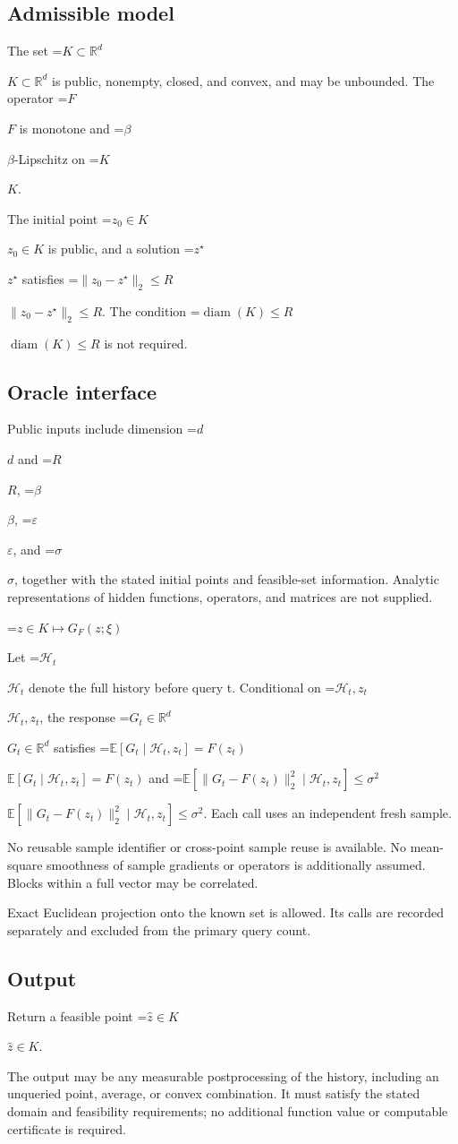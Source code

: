 \documentclass[10pt,a4paper]{article}
\newcommand{\AtlasMath}[1]{\par\begingroup\centering\setbox0=\hbox{$\displaystyle #1$}\ifdim\wd0>1.4\linewidth\typeout{ATLAS WIDE FORMULA: \the\wd0}\fi\ifdim\wd0>\linewidth\resizebox{\linewidth}{!}{\box0}\else\box0\fi\par\endgroup}
\newcommand{\AtlasInlineMath}[1]{\begingroup\setbox0=\hbox{$#1$}\ifdim\wd0>.4\linewidth\endgroup\AtlasMath{#1}\else\endgroup$#1$\fi}
\begin{document}
\subsection{Admissible model}
The set \AtlasInlineMath{K\subset\mathbb R^d} is public, nonempty, closed, and convex, and may be unbounded. The operator \AtlasInlineMath{F} is monotone and \AtlasInlineMath{\beta}-Lipschitz on \AtlasInlineMath{K}.

The initial point \AtlasInlineMath{z_0\in K} is public, and a solution \AtlasInlineMath{z^\star} satisfies \AtlasInlineMath{\|z_0-z^\star\|_2\le R}. The condition \AtlasInlineMath{\operatorname{diam}(K)\le R} is not required.

\subsection{Oracle interface}
Public inputs include dimension \AtlasInlineMath{d} and \AtlasInlineMath{R}, \AtlasInlineMath{\beta}, \AtlasInlineMath{\varepsilon}, and \AtlasInlineMath{\sigma}, together with the stated initial points and feasible-set information. Analytic representations of hidden functions, operators, and matrices are not supplied.


\AtlasMath{z\in K\longmapsto G_F(z;\xi)}


Let \AtlasInlineMath{\mathcal H_t} denote the full history before query t. Conditional on \AtlasInlineMath{\mathcal H_t,z_t}, the response \AtlasInlineMath{G_t\in\mathbb R^d} satisfies \AtlasInlineMath{\mathbb E[G_t\mid\mathcal H_t,z_t]=F(z_t)} and \AtlasInlineMath{\mathbb E[\|G_t-F(z_t)\|_2^2\mid\mathcal H_t,z_t]\le\sigma^2}. Each call uses an independent fresh sample.

No reusable sample identifier or cross-point sample reuse is available. No mean-square smoothness of sample gradients or operators is additionally assumed. Blocks within a full vector may be correlated.

Exact Euclidean projection onto the known set is allowed. Its calls are recorded separately and excluded from the primary query count.

\subsection{Output}
Return a feasible point \AtlasInlineMath{\widehat z\in K}.

The output may be any measurable postprocessing of the history, including an unqueried point, average, or convex combination. It must satisfy the stated domain and feasibility requirements; no additional function value or computable certificate is required.
\end{document}
